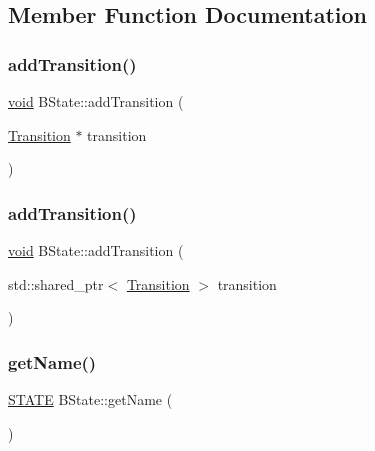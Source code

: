 \subsection{Member Function Documentation}
\mbox{\label{classBState_a19d39e24d561b72484a026a367aee031}} 
\subsubsection{\texorpdfstring{add\+Transition()}{addTransition()}\hspace{0.1cm}{\footnotesize\ttfamily [1/2]}}
{\footnotesize\ttfamily \hyperlink{imgui__impl__opengl3__loader_8h_ac668e7cffd9e2e9cfee428b9b2f34fa7}{void} B\+State\+::add\+Transition (\begin{DoxyParamCaption}\item[{\hyperlink{classTransition}{Transition} $\ast$}]{transition }\end{DoxyParamCaption})}

\mbox{\label{classBState_a2e1c33342d2a21e2c11083e0f89e1748}} 
\subsubsection{\texorpdfstring{add\+Transition()}{addTransition()}\hspace{0.1cm}{\footnotesize\ttfamily [2/2]}}
{\footnotesize\ttfamily \hyperlink{imgui__impl__opengl3__loader_8h_ac668e7cffd9e2e9cfee428b9b2f34fa7}{void} B\+State\+::add\+Transition (\begin{DoxyParamCaption}\item[{std\+::shared\+\_\+ptr$<$ \hyperlink{classTransition}{Transition} $>$}]{transition }\end{DoxyParamCaption})}

\mbox{\label{classBState_acf259690a67bd6d34fe78f95501d5b45}} 
\subsubsection{\texorpdfstring{get\+Name()}{getName()}}
{\footnotesize\ttfamily \hyperlink{BState_8h_a275a67132f10277ada3a0ee3d616b647}{S\+T\+A\+TE} B\+State\+::get\+Name (\begin{DoxyParamCaption}{ }\end{DoxyParamCaption})\hspace{0.3cm}{\ttfamily [inline]}}

